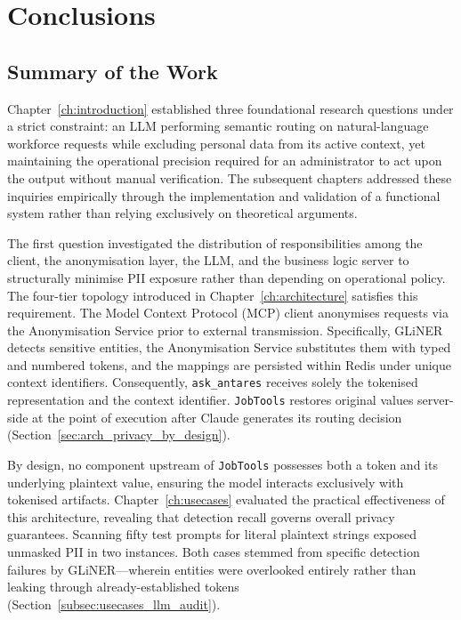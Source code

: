 \chapter{Conclusions}
\label{ch:conclusions}

\section{Summary of the Work}
\label{sec:conclusions_summary}

Chapter~\ref{ch:introduction} established three foundational research questions under a strict constraint: an LLM performing semantic routing on natural-language workforce requests while excluding personal data from its active context, yet maintaining the operational precision required for an administrator to act upon the output without manual verification. The subsequent chapters addressed these inquiries empirically through the implementation and validation of a functional system rather than relying exclusively on theoretical arguments.

The first question investigated the distribution of responsibilities among the client, the anonymisation layer, the LLM, and the business logic server to structurally minimise PII exposure rather than depending on operational policy. The four-tier topology introduced in Chapter~\ref{ch:architecture} satisfies this requirement. The Model Context Protocol (MCP) client anonymises requests via the Anonymisation Service prior to external transmission. Specifically, GLiNER detects sensitive entities, the Anonymisation Service substitutes them with typed and numbered tokens, and the mappings are persisted within Redis under unique context identifiers. Consequently, \texttt{ask\_antares} receives solely the tokenised representation and the context identifier. \texttt{JobTools} restores original values server-side at the point of execution after Claude generates its routing decision (Section~\ref{sec:arch_privacy_by_design}).

By design, no component upstream of \texttt{JobTools} possesses both a token and its underlying plaintext value, ensuring the model interacts exclusively with tokenised artifacts. Chapter~\ref{ch:usecases} evaluated the practical effectiveness of this architecture, revealing that detection recall governs overall privacy guarantees. Scanning fifty test prompts for literal plaintext strings exposed unmasked PII in two instances. Both cases stemmed from specific detection failures by GLiNER---wherein entities were overlooked entirely rather than leaking through already-established tokens (Section~\ref{subsec:usecases_llm_audit}).

